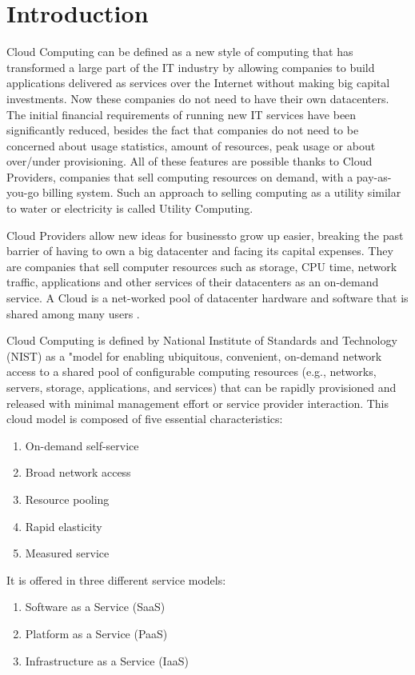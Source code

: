 \chapter{Introduction}
\label{chapter:intro}


Cloud Computing can be defined as a new style of computing that has transformed a large part of the IT industry by allowing companies to build applications delivered as services over the Internet without making big capital investments. 
Now these companies do not need to have their own datacenters. The initial financial requirements of running new IT services have been significantly reduced, besides the fact that companies do not need to be concerned about usage statistics, amount of resources, peak usage or about over/under provisioning. All of these features are possible thanks to Cloud Providers, companies that sell computing resources on demand, with a pay-as-you-go billing system. Such an approach to selling computing as a utility similar to water or electricity is called Utility Computing.
\par
Cloud Providers allow new ideas for businessto grow up easier, breaking the past barrier of having to own a big datacenter and facing its capital expenses. They are companies that sell computer resources such as storage, CPU time, network traffic, applications and other services of their datacenters as an on-demand service. A Cloud is a net-worked pool of datacenter hardware and software that is shared among many users \cite{fox2009above}.
\par
Cloud Computing is defined by National Institute of Standards and Technology (NIST) \cite{mell2011nist} as a "model for enabling ubiquitous, convenient, on-demand network access to a shared pool of configurable computing resources (e.g., networks, servers, storage, applications, and services) that can be rapidly provisioned and released with minimal management effort or service provider interaction. This cloud model is composed of five essential characteristics:
\begin{enumerate}
\item On-demand self-service
\item Broad network access
\item Resource pooling
\item Rapid elasticity
\item Measured service
\end{enumerate}
It is offered in three different service models:
\begin{enumerate}
\item Software as a Service (SaaS)
\item Platform as a Service (PaaS)
\item Infrastructure as a Service (IaaS)
\end{enumerate}
